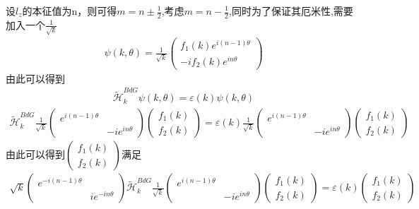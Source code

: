 \documentclass[22pt]{article}
\begin{document}
设$l_z$的本征值为n，则可得$m=n\pm\frac{1}{2}$,考虑$m=n-\frac{1}{2}$,同时为了保证其厄米性,需要加入一个$\frac{1}{\sqrt{k}}$
\begin{align}
	\psi(k,\theta)=
	\frac{1}{\sqrt{k}}
	\begin{pmatrix}
		f_1(k)e^{i(n-1)\theta}\\
		-if_2(k)e^{in\theta}
	\end{pmatrix}
\end{align}
由此可以得到
\begin{align}
	\tilde{\mathcal{H}}_k^{BdG}\psi(k,\theta)=\varepsilon(k)\psi(k,\theta)
\end{align}
\begin{align}
	\nonumber
	\tilde{\mathcal{H}}_k^{BdG}
	\frac{1}{\sqrt{k}}
	\begin{pmatrix}
		e^{i(n-1)\theta} & \\
		&-ie^{in\theta}
	\end{pmatrix}
	\begin{pmatrix}
		f_1(k)\\
		f_2(k)
	\end{pmatrix}
	=\varepsilon(k)
	\frac{1}{\sqrt{k}}
	\begin{pmatrix}
		e^{i(n-1)\theta} & \\
		&-ie^{in\theta}
	\end{pmatrix}
	\begin{pmatrix}
		f_1(k)\\
		f_2(k)
	\end{pmatrix}
\end{align}
由此可以得到$\begin{pmatrix}
	f_1(k)\\
	f_2(k)
\end{pmatrix}$满足
\begin{align}
	\nonumber
	\sqrt{k}
	\begin{pmatrix}
		e^{-i(n-1)\theta} &\\
		&ie^{-in\theta}
	\end{pmatrix}
	\tilde{\mathcal{H}}_k^{BdG}
	\frac{1}{\sqrt{k}}
	\begin{pmatrix}
		e^{i(n-1)\theta} & \\
		&-ie^{in\theta}
	\end{pmatrix}
	\begin{pmatrix}
		f_1(k) \\
		f_2(k)
	\end{pmatrix}
	=\varepsilon(k)
	\begin{pmatrix}
		f_1(k) \\
		f_2(k)
	\end{pmatrix}
\end{align}
\end{document}
